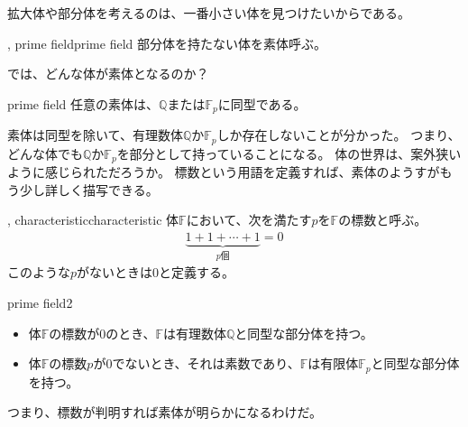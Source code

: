 拡大体や部分体を考えるのは、一番小さい体を見つけたいからである。

\begin{Defi}{, prime field}{prime field}
部分体を持たない体を素体呼ぶ。
\end{Defi}

では、どんな体が素体となるのか？

\begin{Prop}{}{prime field}
任意の素体は、$\mathbb{Q}$または$\mathbb{F}_p$に同型である。
\end{Prop}

素体は同型を除いて、有理数体$\mathbb{Q}$か$\mathbb{F}_p$しか存在しないことが分かった。
つまり、どんな体でも$\mathbb{Q}$か$\mathbb{F}_p$を部分として持っていることになる。
体の世界は、案外狭いように感じられただろうか。
標数という用語を定義すれば、素体のようすがもう少し詳しく描写できる。

\begin{Defi}{, characteristic}{characteristic}
体$\mathbb{F}$において、次を満たす$p$を$\mathbb{F}$の標数と呼ぶ。
\begin{align*}
\underbrace{1 + 1 + \cdots + 1}_{p \mbox{個}} = 0
\end{align*}
このような$p$がないときは$0$と定義する。
\end{Defi}

\begin{Prop}{}{prime field2}\;
\begin{itemize}
\item 体$\mathbb{F}$の標数が$0$のとき、$\mathbb{F}$は有理数体$\mathbb{Q}$と同型な部分体を持つ。
\item 体$\mathbb{F}$の標数$p$が$0$でないとき、それは素数であり、$\mathbb{F}$は有限体$\mathbb{F}_p$と同型な部分体を持つ。
\end{itemize}
\end{Prop}

つまり、標数が判明すれば素体が明らかになるわけだ。

